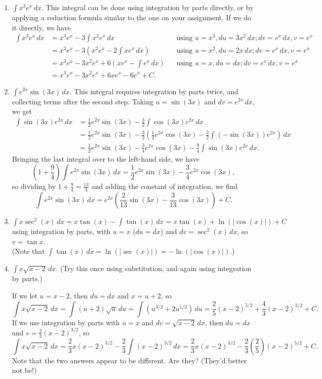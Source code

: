 \documentclass[12pt]{article}
\newcommand{\di}{\displaystyle}
\begin{document}
\begin{enumerate}
 \item $\di \int x^3e^x\,dx$. This integral can be done using integration by parts directly, or by applying a reduction formula similar to the one on your assignment. If we do it directly, we have
\begin{align*}
 \int x^3e^x\,dx &= x^3e^x - 3\int x^2e^x\,dx & & \text{using } u=x^3, du = 3x^2\,dx; dv = e^x\,dx, v = e^x\\
& = x^3e^x -3\left(x^2e^x - 2\int xe^x\,dx\right) & & \text{using } u=x^2, du = 2x\,dx; dv = e^x\,dx, v=e^x\\
& = x^3e^x-3x^2e^x+6\left(xe^x-\int e^x\, dx\right) & & \text{using } u=x, du = dx; dv = e^x\,dx, v=e^x\\
& = x^3e^x-3x^2e^x+6xe^x-6e^x+C.
\end{align*}

 
 \item $\di \int e^{2x}\sin(3x)\,dx$. This integral requires integration by parts twice, and collecting terms after the second step. Taking $u=
\sin(3x)$ and $dv = e^{2x}\,dx$, we get
\begin{align*}
 \int \sin(3x)e^{2x}\,dx &= \frac{1}{2}e^{2x}\sin(3x)-\frac{3}{2}\int \cos(3x)e^{2x}\,dx\\
& = \frac{1}{2}e^{2x}\sin(3x)-\frac{3}{2}\left(\frac{1}{2}e^{2x}\cos(3x)-\frac{3}{2}\int (-\sin(3x))e^{2x}\right)\,dx\\
& = \frac{1}{2}e^{2x}\sin(3x)-\frac{3}{4}e^{2x}\cos(3x) - \frac{9}{4}\int \sin(3x)e^{2x}\,dx.
\end{align*}
Bringing the last integral over to the left-hand side, we have
\[
 \left(1+\frac{9}{4}\right)\int e^{2x}\sin(3x)\,dx = \frac{1}{2}e^{2x}\sin(3x)-\frac{3}{4}e^{2x}\cos(3x),
\]
so dividing by $1+\frac{9}{4} =\frac{13}{4}$ and adding the constant of integration, we find
\[
 \int e^{2x}\sin(3x)\,dx = e^{2x}\left(\frac{2}{13}\sin(3x)-\frac{3}{13}\cos(3x)\right)+C.
\]


 \item $\di \int x\sec^2(x)\,dx = x\tan(x)-\int \tan(x)\,dx = x\tan(x)+\ln(\lvert \cos(x)\rvert)+C$ using integration by parts, with $u=x$ ($du=dx$) and $dv = \sec^2(x)\,dx$, so $v=\tan x$.\\
 (Note that $\int\tan(x)\,dx = \ln(|\sec(x)|) = -\ln(|\cos(x)|)$.)

 \item $\di \int x\sqrt{x-2}\,dx$. (Try this once using substitution, and again using integration by parts.)

If we let $u=x-2$, then $du=dx$ and $x=u+2$, so
\[
 \int x\sqrt{x-2}\,dx = \int (u+2)\sqrt{u}\,du = \int (u^{3/2}+2u^{1/2})\,du = \frac{2}{5}(x-2)^{5/2}+\frac{4}{3}(x-2)^{3/2}+C.
\]
If we use integration by parts with $u=x$ and $dv = \sqrt{x-2}\,dx$, then $du=dx$ and $v = \frac{2}{3}(x-2)^{3/2}$, so
\[
 \int x\sqrt{x-2}\,dx = \frac{2}{3}x(x-2)^{3/2}-\frac{2}{3}\int (x-2)^{3/2}\,dx = \frac{2}{3}x(x-2)^{3/2}-\frac{2}{3}\left(\frac{2}{5}\right)(x-2)^{5/2}+C.
\]
Note that the two answers appear to be different. Are they? (They'd better not be!)


\end{enumerate}
\end{document}
